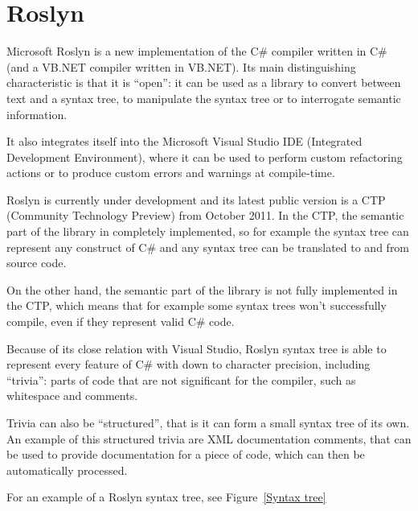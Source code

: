 \chapter{Roslyn}

Microsoft Roslyn is a new implementation of the C\# compiler written in C\#
(and a VB.NET compiler written in VB.NET).
Its main distinguishing characteristic is that it is “open”:
it can be used as a library to convert between text and a syntax tree,
to manipulate the syntax tree or to interrogate semantic information.

It also integrates itself into the Microsoft Visual Studio IDE
(Integrated Development Environment), where it can be used to perform
custom refactoring actions or to produce custom errors and warnings at compile-time.

Roslyn is currently under development and its latest public version is a CTP
(Community Technology Preview) from October 2011.
In the CTP, the semantic part of the library in completely implemented,
so for example the syntax tree can represent any construct of C\#
and any syntax tree can be translated to and from source code.

On the other hand, the semantic part of the library is not fully implemented in the CTP,
which means that for example some syntax trees won't successfully compile,
even if they represent valid C\# code.

Because of its close relation with Visual Studio,
Roslyn syntax tree is able to represent every feature of C\# with down to character precision,
including “trivia”: parts of code that are not significant for the compiler,
such as whitespace and comments.

Trivia can also be “structured”, that is it can form a small syntax tree of its own.
An example of this structured trivia are XML documentation comments,
that can be used to provide documentation for a piece of code,
which can then be automatically processed.

For an example of a Roslyn syntax tree, see Figure~\ref{Syntax tree}

